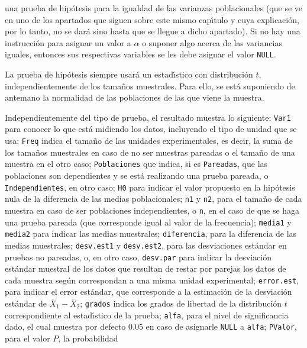\begin{solucion}
 una prueba de hip\'otesis para la igualdad de las varianzas
 poblacionales (que se ve en uno de los apartados que siguen
 sobre este mismo cap\'{\i}tulo
 y cuya explicaci\'on, por lo tanto, no se dar\'a
 sino hasta que se llegue a dicho apartado).
 Si no hay una instrucci\'on para asignar un valor a $\alpha$
 o suponer algo acerca de las variancias iguales,
 entonces sus respectivas variables se les debe asignar el valor
 \texttt{NULL}.
 \par 
 La prueba de hip\'otesis siempre usar\'a un estad\'{\i}stico
 con distribuci\'on $t$,
 independientemente de los tama\~nos muestrales.
 Para ello, se est\'a suponiendo de antemano la normalidad
 de las poblaciones de las que viene la muestra.
 \par 
 Independientemente del tipo de prueba, el resultado muestra lo siguiente:
 \texttt{Var1} para conocer lo que est\'a midiendo los datos,
 incluyendo el tipo de unidad que se usa;
 \texttt{Freq} indica el tama\~no de las unidades experimentales,
 es decir, la suma de los tama\~nos muestrales en caso de no ser
 muestras pareadas o el tama\~no de una muestra en el otro caso;
 \texttt{Poblaciones} que indica, si es \texttt{Pareadas}, 
 que las poblaciones son dependientes
 y se est\'a realizando una prueba pareada,
 o \texttt{Independientes}, en otro caso;
 \texttt{H0} para indicar el valor propuesto en la hip\'otesis nula
 de la diferencia de las medias poblacionales;
 \texttt{n1} y \texttt{n2}, para el tama\~no de cada muestra
 en caso de ser poblaciones independientes, o \texttt{n},
 en el caso de que se haga una prueba pareada
 (que corresponde igual al valor de la frecuencia);
 \texttt{media1} y \texttt{media2} para indicar las medias
 muestrales; \texttt{diferencia}, para la diferencia
 de las medias muestrales;
 \texttt{desv.est1} y \texttt{desv.est2}, 
 para las desviaciones est\'andar en pruebas no pareadas,
 o, en otro caso, \texttt{desv.par}
 para indicar la desviaci\'on est\'andar muestral de los datos
 que resultan de restar por parejas los datos de cada muestra
 seg\'un correspondan a una misma unidad experimental;
 \texttt{error.est}, para indicar el error est\'andar,
 que corresponde a la estimaci\'on de la desviaci\'on est\'andar
 de $\overline{X}_1 - \overline{X}_2$;
 \texttt{grados} indica los grados de libertad
 de la distribuci\'on $t$ correspondiente al estad\'{\i}stico
 de la prueba;
 \texttt{alfa}, para el nivel de significancia dado,
 el cual muestra por defecto $0.05$
 en caso de asignarle \texttt{NULL} a \texttt{alfa};
 \texttt{PValor}, para el valor $P$, la probabilidad

\end{solucion}
